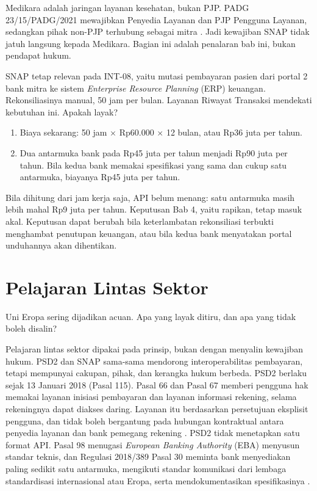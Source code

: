 \begin{kasus}[title={Kasus Medikara Health: Apakah SNAP Berlaku bagi Medikara?}]
Medikara adalah jaringan layanan kesehatan, bukan PJP. PADG \mbox{23/15/PADG/2021} mewajibkan Penyedia Layanan dan PJP
Pengguna Layanan, sedangkan pihak non-PJP terhubung sebagai mitra \cite{c07-padg2021}. Jadi kewajiban SNAP tidak jatuh
langsung kepada Medikara. Bagian ini adalah penalaran bab ini, bukan pendapat hukum.

SNAP tetap relevan pada INT-08, yaitu mutasi pembayaran pasien dari portal 2 bank mitra ke sistem \textit{Enterprise
Resource Planning} (ERP) keuangan. Rekonsiliasinya manual, 50 jam per bulan. Layanan Riwayat Transaksi mendekati
kebutuhan ini. Apakah layak?
\begin{enumerate}
  \item Biaya sekarang: 50 jam $\times$ Rp60.000 $\times$ 12 bulan, atau Rp36 juta per tahun.
  \item Dua antarmuka bank pada Rp45 juta per tahun menjadi Rp90 juta per tahun. Bila kedua bank memakai spesifikasi
        yang sama dan cukup satu antarmuka, biayanya Rp45 juta per tahun.
\end{enumerate}

Bila dihitung dari jam kerja saja, API belum menang: satu antarmuka masih lebih mahal Rp9 juta per tahun. Keputusan
Bab 4, yaitu rapikan, tetap masuk akal. Keputusan dapat berubah bila keterlambatan rekonsiliasi terbukti menghambat
penutupan keuangan, atau bila kedua bank menyatakan portal unduhannya akan dihentikan.
\end{kasus}

\section{Pelajaran Lintas Sektor}

Uni Eropa sering dijadikan acuan. Apa yang layak ditiru, dan apa yang tidak boleh disalin?

Pelajaran lintas sektor dipakai pada prinsip, bukan dengan menyalin kewajiban hukum. PSD2 dan SNAP sama-sama mendorong
interoperabilitas pembayaran, tetapi mempunyai cakupan, pihak, dan kerangka hukum berbeda. PSD2 berlaku sejak 13
Januari 2018 (Pasal 115). Pasal 66 dan Pasal 67 memberi pengguna hak memakai layanan inisiasi pembayaran dan layanan
informasi rekening, selama rekeningnya dapat diakses daring. Layanan itu berdasarkan persetujuan eksplisit pengguna,
dan tidak boleh bergantung pada hubungan kontraktual antara penyedia layanan dan bank pemegang rekening
\cite{c07-psd2}. PSD2 tidak menetapkan satu format API. Pasal 98 menugasi \textit{European Banking Authority} (EBA)
menyusun standar teknis, dan Regulasi 2018/389 Pasal 30 meminta bank menyediakan paling sedikit satu antarmuka,
mengikuti standar komunikasi dari lembaga standardisasi internasional atau Eropa, serta mendokumentasikan
spesifikasinya \cite{c07-psd2, rts2018}.

